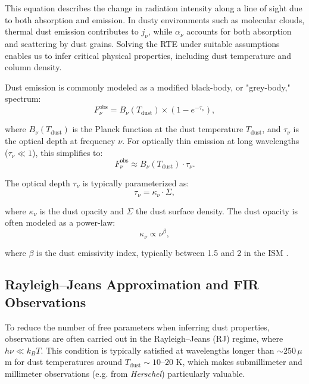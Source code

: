 This equation describes the change in radiation intensity along a line of sight due to both absorption and emission. In dusty environments such as molecular clouds, thermal dust emission contributes to \( j_\nu \), while \( \alpha_\nu \) accounts for both absorption and scattering by dust grains. Solving the RTE under suitable assumptions enables us to infer critical physical properties, including dust temperature and column density.

Dust emission is commonly modeled as a modified black-body, or "grey-body," spectrum:
\begin{equation}
    F_\nu^{\mathrm{obs}} = B_\nu(T_\mathrm{dust}) \times \left(1 - e^{-\tau_\nu}\right),
\end{equation}

where $B_\nu(T_\mathrm{dust})$ is the Planck function at the dust temperature $T_\mathrm{dust}$, and $\tau_\nu$ is the optical depth at frequency $\nu$. For optically thin emission at long wavelengths ($\tau_\nu \ll 1$), this simplifies to:
\begin{equation}
    F_\nu^{\mathrm{obs}} \approx B_\nu(T_\mathrm{dust}) \cdot \tau_\nu.
\end{equation}

The optical depth $\tau_\nu$ is typically parameterized as:
\begin{equation}
    \tau_\nu = \kappa_\nu \cdot \Sigma,
\end{equation}

where $\kappa_\nu$ is the dust opacity and $\Sigma$ the dust surface density. The dust opacity is often modeled as a power-law:
\begin{equation}
    \kappa_\nu \propto \nu^\beta,
\end{equation}

where $\beta$ is the dust emissivity index, typically between 1.5 and 2 in the ISM \cite{draine2006submillimeter}.

\subsection{Rayleigh–Jeans Approximation and FIR Observations}

To reduce the number of free parameters when inferring dust properties, observations are often carried out in the Rayleigh–Jeans (RJ) regime, where $h\nu \ll k_B T$. This condition is typically satisfied at wavelengths longer than $\sim 250\,\mu$m for dust temperatures around $T_\mathrm{dust} \sim 10$–$20$ K, which makes submillimeter and millimeter observations (e.g. from \textit{Herschel}) particularly valuable.


